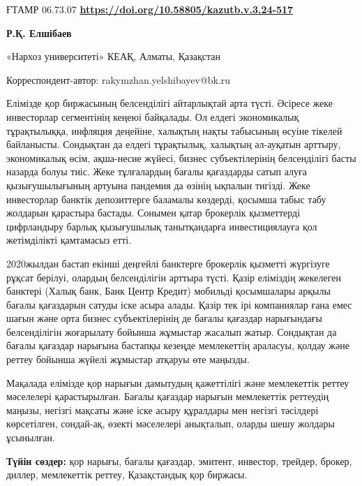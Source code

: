 \newpage
ҒТАМР 06.73.07
\hfill {\bfseries \href{https://doi.org/10.58805/kazutb.v.3.24-517}{https://doi.org/10.58805/kazutb.v.3.24-517}}


\begin{center}
{\bfseries Р.Қ. Елшібаев}

«Нархоз университеті» КЕАҚ, Алматы, Қазақстан
\end{center}

\envelope Корреспондент-автор: rakymzhan.yelshibayev@bk.ru

Елімізде қор биржасының белсенділігі айтарлықтай арта түсті. Әсіресе
жеке инвесторлар сегментінің кеңеюі байқалады. Ол елдегі экономикалық
тұрақтылыққа, инфляция деңейіне, халықтың нақты табысының өсуіне тікелей
байланысты. Сондықтан да елдегі тұрақтылық, халықтың әл-ауқатын арттыру,
экономикалық өсім, ақша-несие жүйесі, бизнес субъектілерінің
белсенділігі басты назарда болуы тиіс. Жеке тұлғалардың бағалы
қағаздарды сатып алуға қызығушылығының артуына пандемия да өзінің
ықпалын тигізді. Жеке инвесторлар банктік депозиттерге баламалы
көздерді, қосымша табыс табу жолдарын қарастыра бастады. Сонымен қатар
брокерлік қызметтерді цифрландыру барлық қызығушылық танытқандарға
инвестициялауға қол жетімділікті қамтамасыз етті.

2020жылдан бастап екінші деңгейлі банктерге брокерлік қызметті жүргізуге
рұқсат берілуі, олардың белсенділігін арттыра түсті. Қазір еліміздің
жекелеген банктері (Халық банк, Банк Центр Кредит) мобильді қосымшалары
арқылы бағалы қағаздарын сатуды іске асыра алады. Қазір тек ірі
компаниялар ғана емес шағын және орта бизнес субъектілерінің де бағалы
қағаздар нарығындағы белсенділігін жоғарылату бойынша жұмыстар жасалып
жатыр. Сондықтан да бағалы қағаздар нарығына бастапқы кезеңде
мемлекеттің араласуы, қолдау және реттеу бойынша жүйелі жұмыстар атқаруы
өте маңызды.

Мақалада елімізде қор нарығын дамытудың қажеттілігі және мемлекеттік
реттеу мәселелері қарастырылған. Бағалы қағаздар нарығын мемлекеттік
реттеудің маңызы, негізгі мақсаты және іске асыру құралдары мен негізгі
тәсілдері көрсетілген, сондай-ақ, өзекті мәселелері анықталып, оларды
шешу жолдары ұсынылған.

{\bfseries Түйін сөздер:} қор нарығы, бағалы қағаздар, эмитент, инвестор,
трейдер, брокер, диллер, мемлекеттік реттеу, Қазақстандық қор биржасы.



